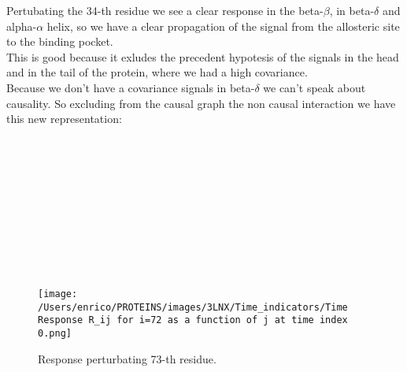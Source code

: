 \documentclass[English, Lau, oneside]{sapthesis}
\begin{document}
Pertubating the 34-th residue we see a clear response  in the beta-$\beta$, in beta-$\delta$ and alpha-$\alpha$ helix, so we have a clear propagation of the signal from the allosteric site to the binding pocket.\\
This is good because it exludes the precedent hypotesis of the signals in the head and in the tail of the protein, where we had a high covariance.\\
Because we don't have a covariance signals in beta-$\delta$ we can't speak about causality. 
So excluding from the causal graph the non causal interaction we have this new representation:\\






\\\\\\\\\\\\\\\\\\
\begin{figure}[h!]
    \centering
    \texttt{[image: /Users/enrico/PROTEINS/images/3LNX/Time\_indicators/Time Response R\_ij for i=72 as a function of j at time index 0.png]}
    \caption{Response perturbating 73-th residue.}
    \label{fig:resp73}
\end{figure}\\\\\\\\\\
\end{document}
